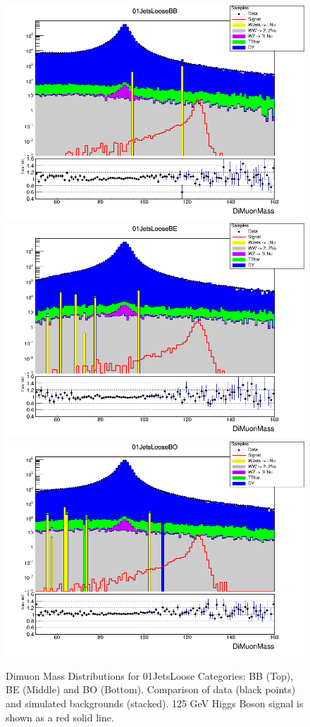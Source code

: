 \begin{figure}[htbp]
  \centering
  \includegraphics[width=0.65\linewidth]{figures/ch_higgs/distributions/baseline_kalman/distribution__01JetsLooseBB__DiMuonMass__logY.png}\\
  \includegraphics[width=0.65\linewidth]{figures/ch_higgs/distributions/baseline_kalman/distribution__01JetsLooseBE__DiMuonMass__logY.png}\\
  \includegraphics[width=0.65\linewidth]{figures/ch_higgs/distributions/baseline_kalman/distribution__01JetsLooseBO__DiMuonMass__logY.png}
  \caption{Dimuon Mass Distributions for 01JetsLoose Categories: BB (Top), BE (Middle) and BO (Bottom). Comparison of data (black points) and simulated backgrounds (stacked). 125 GeV Higgs Boson signal is shown as a red solid line.}
  \label{fig:higgs_categorization_01jetsloosebbbebo}
\end{figure}
